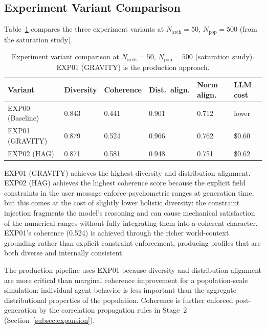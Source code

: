 \documentclass[a4paper,12pt]{article}
\begin{document}
\subsection{Experiment Variant Comparison}
\label{subsec:variant_comparison}

Table~\ref{tab:exp_comparison} compares the three experiment variants
at $N_\text{arch} = 50$, $N_\text{pop} = 500$ (from the saturation study).

\begin{table}[H]
\caption{Experiment variant comparison at $N_\text{arch} = 50$,
$N_\text{pop} = 500$ (saturation study). EXP01 (GRAVITY) is the
production approach.}
\label{tab:exp_comparison}
\begin{tabularx}{\textwidth}{lXXXXX}
\toprule
\textbf{Variant}  & \textbf{Diversity} & \textbf{Coherence}
                  & \textbf{Dist.\ align.} & \textbf{Norm align.}
                  & \textbf{LLM cost} \\
\midrule
EXP00 (Baseline) & 0.843 & 0.441 & 0.901 & 0.712 & lower \\
EXP01 (GRAVITY)  & 0.879 & 0.524 & 0.966 & 0.762 & \$0.60 \\
EXP02 (HAG)      & 0.871 & 0.581 & 0.948 & 0.751 & \$0.62 \\
\bottomrule
\end{tabularx}
\end{table}

EXP01 (GRAVITY) achieves the highest diversity and distribution alignment.
EXP02 (HAG) achieves the highest coherence score because the explicit
field constraints in the user message enforce psychometric ranges at
generation time, but this comes at the cost of slightly lower holistic
diversity: the constraint injection fragments the model's reasoning
and can cause mechanical satisfaction of the numerical ranges without
fully integrating them into a coherent character. EXP01's coherence
(0.524) is achieved through the richer world-context grounding rather
than explicit constraint enforcement, producing profiles that are both
diverse and internally consistent.

The production pipeline uses EXP01 because diversity and distribution
alignment are more critical than marginal coherence improvement for
a population-scale simulation: individual agent behavior is less
important than the aggregate distributional properties of the population.
Coherence is further enforced post-generation by the correlation
propagation rules in Stage~2 (Section~\ref{subsec:expansion}).
\end{document}
